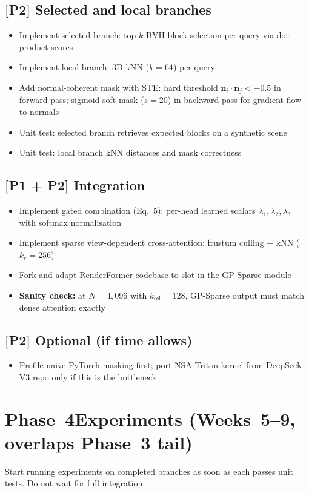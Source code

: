 \documentclass[11pt,a4paper]{article}
\newcommand{\role}[1]{\textbf{[#1]}}
\newcommand{\critical}[1]{\textcolor{warn}{\textbf{#1}}}
\newcommand{\sq}{\item[$\square$]}
\begin{document}
\subsection{\role{P2} Selected and local branches}
\begin{itemize}[leftmargin=1.8em, itemsep=2pt]
  \sq Implement selected branch: top-$k$ BVH block selection per query via dot-product scores
  \sq Implement local branch: 3D kNN ($k = 64$) per query
  \sq Add normal-coherent mask with STE: hard threshold $\mathbf{n}_i \cdot \mathbf{n}_j < -0.5$
      in forward pass; sigmoid soft mask ($s = 20$) in backward pass for gradient flow to normals
  \sq Unit test: selected branch retrieves expected blocks on a synthetic scene
  \sq Unit test: local branch kNN distances and mask correctness
\end{itemize}

\subsection{\role{P1 + P2} Integration}
\begin{itemize}[leftmargin=1.8em, itemsep=2pt]
  \sq Implement gated combination (Eq.~5): per-head learned scalars
      $\lambda_1, \lambda_2, \lambda_3$ with softmax normalisation
  \sq Implement sparse view-dependent cross-attention: frustum culling + kNN ($k_r = 256$)
  \sq Fork and adapt RenderFormer codebase to slot in the GP-Sparse module
  \sq \critical{Sanity check:} at $N = 4{,}096$ with $k_\text{sel} = 128$,
      GP-Sparse output must match dense attention exactly
\end{itemize}

\subsection{\role{P2} Optional (if time allows)}
\begin{itemize}[leftmargin=1.8em, itemsep=2pt]
  \sq Profile naive PyTorch masking first; port NSA Triton kernel from DeepSeek-V3
      repo only if this is the bottleneck
\end{itemize}

\section{Phase~4\quad Experiments \textnormal{(Weeks~5--9, overlaps Phase~3 tail)}}

Start running experiments on completed branches as soon as each passes unit tests.
Do not wait for full integration.
\end{document}
